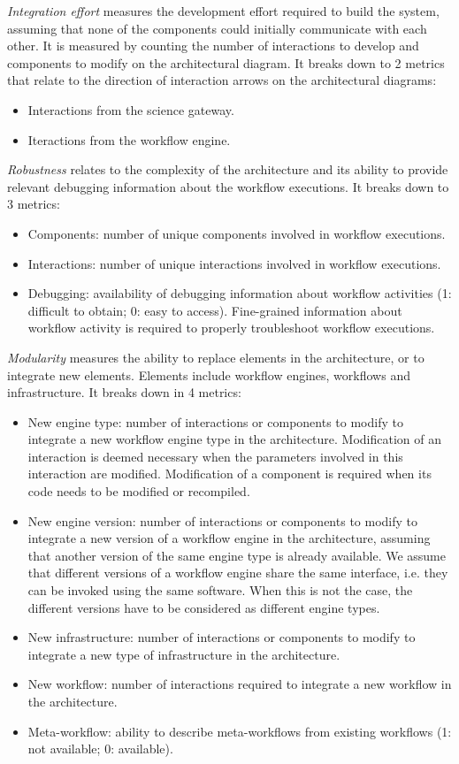 \documentclass[preprint,3p,twocolumn]{elsarticle}
\begin{document}
\emph{Integration effort} measures the development effort required to build
the system, assuming that none of the components could initially
communicate with each other. It is measured by counting the number of
interactions to develop and components to modify on the architectural
diagram. It breaks down to 2 metrics that relate to the direction of
interaction arrows on the architectural diagrams:
\begin{itemize}[itemsep=0cm]
\item Interactions from the science gateway. 
\item Iteractions from the workflow engine. 
\end{itemize}

\emph{Robustness} relates to the complexity of the architecture and
its ability to provide relevant debugging information about the
workflow executions. It breaks down to 3 metrics:
\begin{itemize}[itemsep=0cm]
\item Components: number of unique components involved in workflow executions.
\item Interactions: number of unique interactions involved in workflow executions. 
\item Debugging: availability of debugging information about workflow
  activities (1: difficult to obtain; 0: easy to access). Fine-grained
  information about workflow activity is required to properly
  troubleshoot workflow executions.
\end{itemize}

\emph{Modularity} measures the ability to replace elements in the
architecture, or to integrate new elements. Elements include
workflow engines, workflows and infrastructure. It breaks down in 4
metrics:
\begin{itemize}[itemsep=0cm]
\item New engine type: number of interactions or components to modify
  to integrate a new workflow engine type in the
  architecture. Modification of an interaction is deemed necessary
  when the parameters involved in this interaction are
  modified. Modification of a component is required when its code
  needs to be modified or recompiled.
\item New engine version: number of interactions or components to
  modify to integrate a new version of a workflow engine in the
  architecture, assuming that another version of the same engine type
  is already available. We assume that different versions of a
  workflow engine share the same interface, i.e. they can be invoked
  using the same software. When this is not the case, the different
  versions have to be considered as different engine types.
\item New infrastructure: number of interactions or components to
  modify to integrate a new type of infrastructure in the
  architecture.
\item New workflow: number of interactions required to integrate a new
  workflow in the architecture.
\item Meta-workflow: ability to describe meta-workflows from existing
  workflows (1: not available; 0: available).
\end{itemize}
\end{document}
